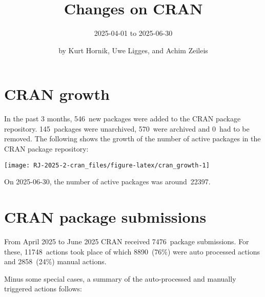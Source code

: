 \title{Changes on CRAN}

\subtitle{%
2025-04-01 to 2025-06-30
}

\author{by Kurt Hornik, Uwe Ligges, and Achim Zeileis}

\maketitle


\section{CRAN growth}\label{cran-growth}

In the past 3 months, 546~new packages were
added to the CRAN package repository. 145~packages
were unarchived, 570~were archived and
0~had to be removed. The following shows the
growth of the number of active packages in the CRAN package repository:

\begin{center}\texttt{[image: RJ-2025-2-cran\_files/figure-latex/cran\_growth-1]} \end{center}

\noindent On 2025-06-30, the number of active packages was around~22397.

\section{CRAN package submissions}\label{cran-package-submissions}

From April 2025 to June 2025
CRAN received 7476~package submissions.
For these, 11748~actions took place of which
8890~(76\%) were auto processed actions and
2858~(24\%) manual actions.

Minus some special cases, a summary of the auto-processed and manually
triggered actions follows:


